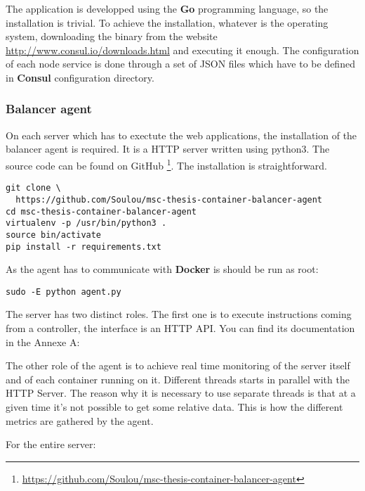 The application is developped using the \textbf{Go} programming language, so
the installation is trivial. To achieve the installation, whatever is the
operating system, downloading the binary from the website
\url{http://www.consul.io/downloads.html} and executing it enough.  The
configuration of each node service is done through a set of JSON files which
have to be defined in \textbf{Consul} configuration directory.

\subsubsection{Balancer agent}

On each server which has to exectute the web applications, the installation
of the balancer agent is required. It is a HTTP server written using python3.
The source code can be found on GitHub
\footnote{\url{https://github.com/Soulou/msc-thesis-container-balancer-agent}}. The
installation is straightforward.

\vspace{1em}
\begin{lstlisting}
git clone \
  https://github.com/Soulou/msc-thesis-container-balancer-agent
cd msc-thesis-container-balancer-agent
virtualenv -p /usr/bin/python3 .
source bin/activate
pip install -r requirements.txt
\end{lstlisting}

As the agent has to communicate with \textbf{Docker} is should be run as
root:

\vspace{1em}
\begin{lstlisting}
sudo -E python agent.py
\end{lstlisting}

The server has two distinct roles. The first one is to execute instructions
coming from a controller, the interface is an HTTP API. You can find its
documentation in the Annexe A: ~\nameref{app:agent-api}

The other role of the agent is to achieve real time monitoring of the
server itself and of each container running on it. Different threads
starts in parallel with the HTTP Server. The reason why it is necessary
to use separate threads is that at a given time it's not possible to
get some relative data. This is how the different metrics are gathered
by the agent.

For the entire server:

